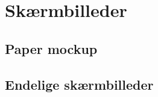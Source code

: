 \chapter{Skærmbilleder}
\label{App_GUI}

\section{Paper mockup}
\label{App_GUI_paper}

\section{Endelige skærmbilleder}
\label{App_GUI_final}